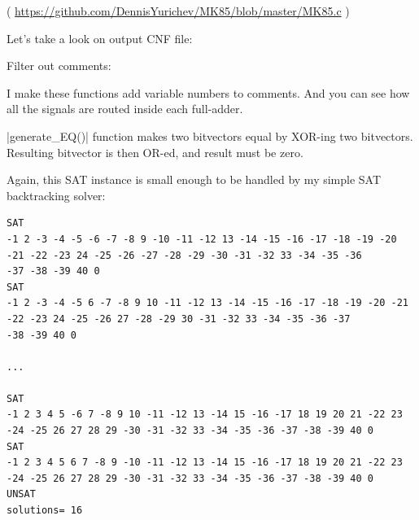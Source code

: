 ( \url{https://github.com/DennisYurichev/MK85/blob/master/MK85.c} )

Let's take a look on output CNF file:



Filter out comments:



I make these functions add variable numbers to comments.
And you can see how all the signals are routed inside each full-adder.

|generate\_EQ()| function makes two bitvectors equal by XOR-ing two bitvectors.
Resulting bitvector is then OR-ed, and result must be zero.

Again, this SAT instance is small enough to be handled by my simple SAT backtracking solver:

\begin{lstlisting}
SAT
-1 2 -3 -4 -5 -6 -7 -8 9 -10 -11 -12 13 -14 -15 -16 -17 -18 -19 -20 -21 -22 -23 24 -25 -26 -27 -28 -29 -30 -31 -32 33 -34 -35 -36
-37 -38 -39 40 0
SAT
-1 2 -3 -4 -5 6 -7 -8 9 10 -11 -12 13 -14 -15 -16 -17 -18 -19 -20 -21 -22 -23 24 -25 -26 27 -28 -29 30 -31 -32 33 -34 -35 -36 -37
-38 -39 40 0

...

SAT
-1 2 3 4 5 -6 7 -8 9 10 -11 -12 13 -14 15 -16 -17 18 19 20 21 -22 23 -24 -25 26 27 28 29 -30 -31 -32 33 -34 -35 -36 -37 -38 -39 40 0
SAT
-1 2 3 4 5 6 7 -8 9 -10 -11 -12 13 -14 15 -16 -17 18 19 20 21 -22 23 -24 -25 26 27 28 29 -30 -31 -32 33 -34 -35 -36 -37 -38 -39 40 0
UNSAT
solutions= 16
\end{lstlisting}


